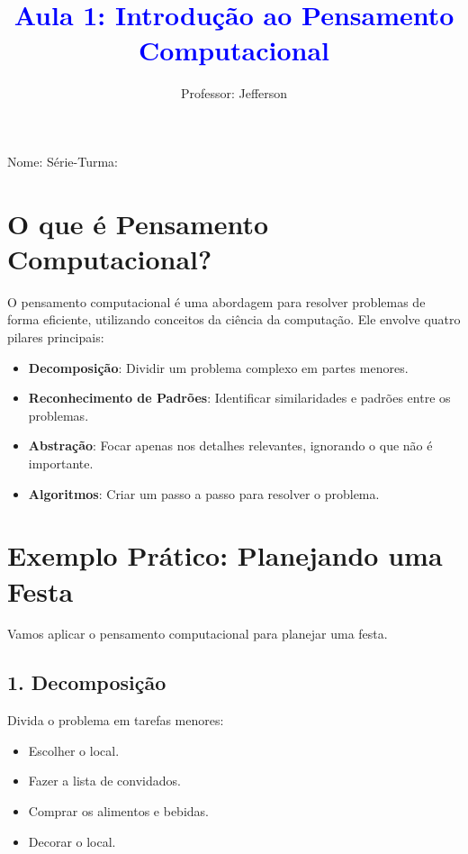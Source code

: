 \documentclass[12pt]{article}
\title{\textcolor{blue}{Aula 1: Introdução ao Pensamento Computacional}}
\author{Professor: Jefferson}
\date{}
\begin{document}
\maketitle

\begin{center}
\large{Nome: \underline{\hspace{8cm}} \quad Série-Turma: \underline{\hspace{3cm}}}
\end{center}

\begin{multicols}{2}

\section*{O que é Pensamento Computacional?}

O pensamento computacional é uma abordagem para resolver problemas de forma eficiente, utilizando conceitos da ciência da computação. Ele envolve quatro pilares principais:

\begin{itemize}
    \item \textbf{Decomposição}: Dividir um problema complexo em partes menores.
    \item \textbf{Reconhecimento de Padrões}: Identificar similaridades e padrões entre os problemas.
    \item \textbf{Abstração}: Focar apenas nos detalhes relevantes, ignorando o que não é importante.
    \item \textbf{Algoritmos}: Criar um passo a passo para resolver o problema.
\end{itemize}

\section*{Exemplo Prático: Planejando uma Festa}

Vamos aplicar o pensamento computacional para planejar uma festa.

\subsection*{1. Decomposição}
Divida o problema em tarefas menores:
\begin{itemize}
    \item Escolher o local.
    \item Fazer a lista de convidados.
    \item Comprar os alimentos e bebidas.
    \item Decorar o local.
\end{itemize}


\end{multicols}
\end{document}
